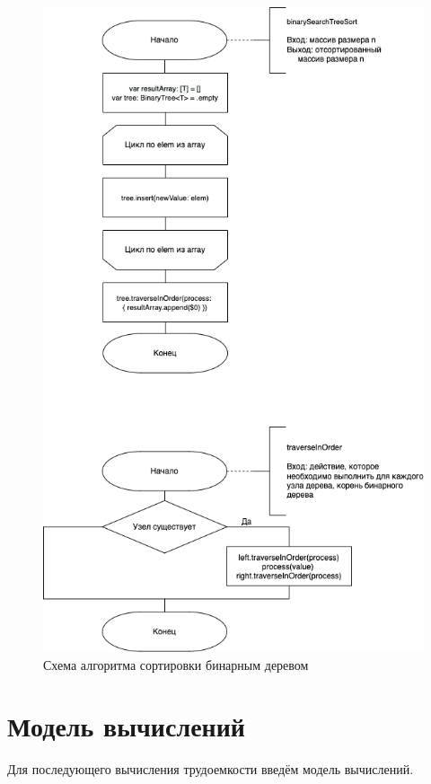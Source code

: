 \begin{figure}[h!]
	\centering
	\includegraphics[scale=0.65]{img/BinaryTree.png}
	\caption{Схема алгоритма сортировки бинарным деревом}
	\label{fig:mpr}
\end{figure}

\section{Модель вычислений}

Для последующего вычисления трудоемкости введём модель вычислений.

